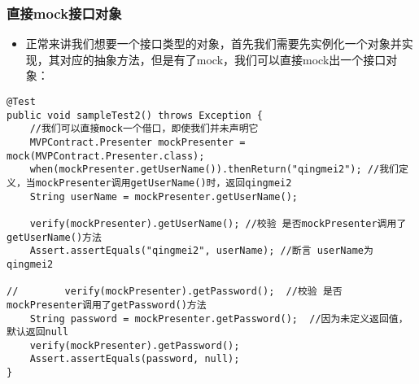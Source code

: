 \documentclass[9pt, b5paper]{article}
\begin{document}
\subsubsection{直接mock接口对象}
\label{sec-1-1-2}
\begin{itemize}
\item 正常来讲我们想要一个接口类型的对象，首先我们需要先实例化一个对象并实现，其对应的抽象方法，但是有了mock，我们可以直接mock出一个接口对象：
\end{itemize}
\begin{verbatim}
@Test
public void sampleTest2() throws Exception {
    //我们可以直接mock一个借口，即使我们并未声明它
    MVPContract.Presenter mockPresenter = mock(MVPContract.Presenter.class);
    when(mockPresenter.getUserName()).thenReturn("qingmei2"); //我们定义，当mockPresenter调用getUserName()时，返回qingmei2
    String userName = mockPresenter.getUserName();

    verify(mockPresenter).getUserName(); //校验 是否mockPresenter调用了getUserName()方法
    Assert.assertEquals("qingmei2", userName); //断言 userName为qingmei2

//        verify(mockPresenter).getPassword();  //校验 是否mockPresenter调用了getPassword()方法
    String password = mockPresenter.getPassword();  //因为未定义返回值，默认返回null
    verify(mockPresenter).getPassword();
    Assert.assertEquals(password, null);
}
\end{verbatim}
\end{document}
